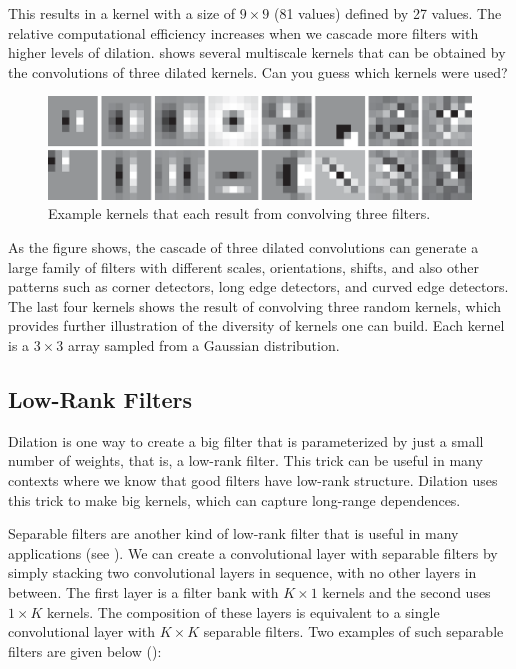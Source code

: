 This results in a kernel with a size of $9 \times 9$ (81 values) defined by 27 values. The relative computational efficiency increases when we cascade more filters with higher levels of dilation. \Fig{\ref{fig:convolutional_neural_nets:kernels_resulting_from_dilated_filters}} shows several multiscale kernels that can be obtained by the convolutions of three dilated kernels. Can you guess which kernels were used?

\begin{figure}[h]
    \centerline{
        \includegraphics[width=1\linewidth]{./figures/convolutional_neural_nets/dilated_examples.eps}}
    \caption{Example kernels that each result from convolving three filters.}
    \label{fig:convolutional_neural_nets:kernels_resulting_from_dilated_filters}
\end{figure}

As the figure shows, the cascade of three dilated convolutions can generate a large family of filters with different scales, orientations, shifts, and also other patterns such as corner detectors, long edge detectors, and curved edge detectors. The last four kernels shows the result of convolving three random kernels, which provides further illustration of the diversity of kernels one can build. Each kernel is a $3 \times 3$ array sampled from a Gaussian distribution.

\subsection{Low-Rank Filters}
Dilation is one way to create a big filter that is parameterized by just a small number of weights, that is, a low-rank filter. This trick can be useful in many contexts where we know that good filters have low-rank structure. Dilation uses this trick to make big kernels, which can capture long-range dependences.

Separable filters are another kind of low-rank filter that is useful in many applications (see \chap{\ref{chapter:fourier_analysis}}). We can create a convolutional layer with separable filters by simply stacking two convolutional layers in sequence, with no other layers in between. The first layer is a filter bank with $K \times 1$ kernels and the second uses $1 \times K$ kernels. The composition of these layers is equivalent to a single convolutional layer with $K \times K$ separable filters. Two examples of such separable filters are given below (\fig{\ref{fig:convolutional_neural_nets:kernels_separable_aprox}}):

